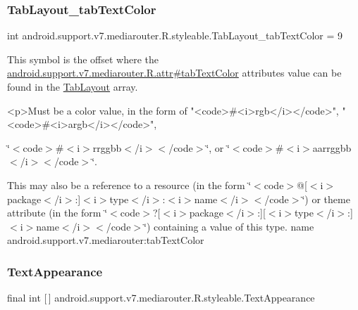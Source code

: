\subsubsection{\texorpdfstring{Tab\+Layout\+\_\+tab\+Text\+Color}{TabLayout\_tabTextColor}}
{\footnotesize\ttfamily int android.\+support.\+v7.\+mediarouter.\+R.\+styleable.\+Tab\+Layout\+\_\+tab\+Text\+Color = 9\hspace{0.3cm}{\ttfamily [static]}}

This symbol is the offset where the \hyperlink{classandroid_1_1support_1_1v7_1_1mediarouter_1_1R_1_1attr_ac6c22cc3afe53aa6685979988be4035f}{android.\+support.\+v7.\+mediarouter.\+R.\+attr\#tab\+Text\+Color} attribute\textquotesingle{}s value can be found in the \hyperlink{classandroid_1_1support_1_1v7_1_1mediarouter_1_1R_1_1styleable_a94de1350e0a902b4a974d775f2f4f25e}{Tab\+Layout} array.

\begin{DoxyVerb}      <p>Must be a color value, in the form of "<code>#<i>rgb</i></code>", "<code>#<i>argb</i></code>",
\end{DoxyVerb}
 \char`\"{}$<$code$>$\#$<$i$>$rrggbb$<$/i$>$$<$/code$>$\char`\"{}, or \char`\"{}$<$code$>$\#$<$i$>$aarrggbb$<$/i$>$$<$/code$>$\char`\"{}. 

This may also be a reference to a resource (in the form \char`\"{}$<$code$>$@\mbox{[}$<$i$>$package$<$/i$>$\+:\mbox{]}$<$i$>$type$<$/i$>$\+:$<$i$>$name$<$/i$>$$<$/code$>$\char`\"{}) or theme attribute (in the form \char`\"{}$<$code$>$?\mbox{[}$<$i$>$package$<$/i$>$\+:\mbox{]}\mbox{[}$<$i$>$type$<$/i$>$\+:\mbox{]}$<$i$>$name$<$/i$>$$<$/code$>$\char`\"{}) containing a value of this type.  name android.\+support.\+v7.\+mediarouter\+:tab\+Text\+Color \mbox{\label{classandroid_1_1support_1_1v7_1_1mediarouter_1_1R_1_1styleable_afa2418a8445abd4ca0361d2d60e02f3d}} 
\subsubsection{\texorpdfstring{Text\+Appearance}{TextAppearance}}
{\footnotesize\ttfamily final int \mbox{[}$\,$\mbox{]} android.\+support.\+v7.\+mediarouter.\+R.\+styleable.\+Text\+Appearance\hspace{0.3cm}{\ttfamily [static]}}

